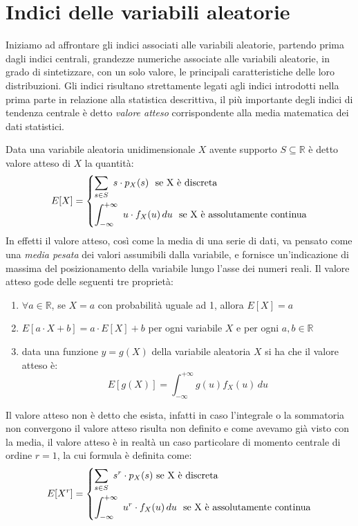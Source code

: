 \documentclass[a4paper,12pt, oneside]{book}
\newcommand{\numberset}{\mathbb}
\newcommand{\R}{\numberset{R}}
\begin{document}
\section{Indici delle variabili aleatorie}
Iniziamo ad affrontare gli indici associati alle variabili aleatorie, partendo prima dagli indici centrali,
grandezze numeriche associate alle variabili aleatorie, in grado di sintetizzare, con un solo valore,
le principali caratteristiche delle loro distribuzioni.\newline
Gli indici risultano strettamente legati agli indici introdotti nella prima parte in relazione alla 
statistica descrittiva, il più importante degli indici di tendenza centrale è detto \emph{valore atteso}
corrispondente alla media matematica dei dati statistici.

Data una variabile aleatoria unidimensionale $X$ avente supporto $S \subseteq \R$ è detto valore atteso di $X$ la quantità:
\[E[X] = \begin{dcases}
           \sum_{s\in S}\,\, s\cdot p_X(s) \,\,\mbox{ se X è discreta}\\
           \int_{-\infty}^{+\infty}\,\, u\cdot f_X(u)\,du \,\,\mbox{ se X è assolutamente continua}\\
         \end{dcases}\]
In effetti il valore atteso, così come la media di una serie di dati, va pensato come una \textit{media pesata}
dei valori assumibili dalla variabile, e fornisce un'indicazione di massima del posizionamento della variabile
lungo l'asse dei numeri reali.\newline
Il valore atteso gode delle seguenti tre proprietà:
\begin{enumerate}
    \item $\forall a \in \R$, se $X = a$ con probabilità uguale ad 1, allora $E[X] = a$
    \item $E[a\cdot X + b] = a\cdot E[X] + b$ per ogni variabile $X$ e per ogni $a, b \in \R$
    \item data una funzione $y = g(X)$ della variabile aleatoria $X$ si ha che il valore atteso è:
            \[E[g(X)]=\int_{-\infty}^{+\infty}g(u)f_X(u)\,du\]
\end{enumerate}
Il valore atteso non è detto che esista, infatti in caso l'integrale o la sommatoria non convergono il valore
atteso risulta non definito e come avevamo già visto con la media, il valore atteso è in realtà un caso
particolare di momento centrale di ordine $r = 1$, la cui formula è definita come:
\[ E[X^r] = \begin{dcases}
                \sum _{s \in S} \,\, s^r \cdot p_X(s) \,\,\mbox{se X è discreta}\\
                \int_{-\infty}^{+\infty}\,\, u^r\cdot f_X(u)\,du \,\,\mbox{ se X è assolutamente continua}\\
            \end{dcases}\]
\end{document}
